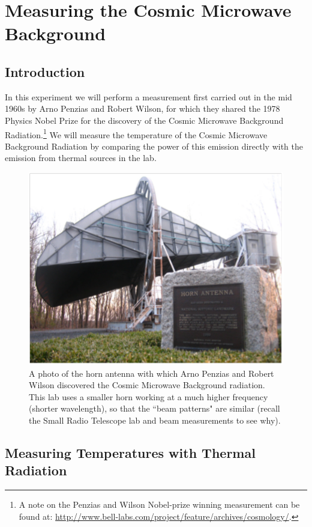 \chapter{Measuring the Cosmic Microwave Background}



\section*{Introduction}

In this experiment we will perform a measurement first carried out in the mid 1960s by Arno Penzias and Robert Wilson, for which they shared the 1978 Physics Nobel Prize for the discovery of the Cosmic Microwave Background Radiation.\footnote{A note on the Penzias and Wilson Nobel-prize winning measurement can be found at: \url{http://www.bell-labs.com/project/feature/archives/cosmology/}.}  We will measure the temperature of the Cosmic Microwave Background Radiation by comparing the  power of this emission directly with the emission from thermal sources in the lab. 

\begin{figure}[htbp]
	\begin{center}
		\includegraphics[width=.45\textwidth]{cmb/CMB-horn-antenna.pdf}
		\caption{A photo of the horn antenna with which Arno Penzias and Robert Wilson discovered the Cosmic Microwave Background radiation. This lab uses a smaller horn working at a much higher frequency (shorter wavelength), so that the ``beam patterns" are similar (recall the Small Radio Telescope lab and beam measurements to see why). }
		\label{fig:PW-horn}
	\end{center}
\end{figure}

\section{Measuring Temperatures with Thermal Radiation}


